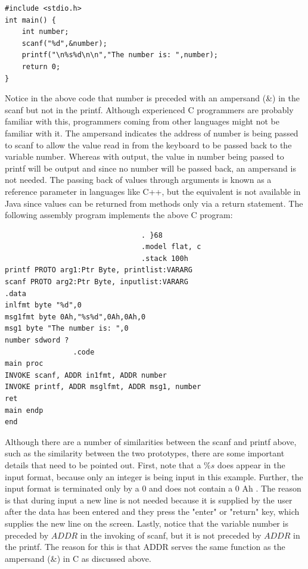 \documentclass[10pt]{book}
\begin{document}
\begin{verbatim}
#include <stdio.h>
int main() {
    int number;
    scanf("%d",&number);
    printf("\n%s%d\n\n","The number is: ",number);
    return 0;
}
\end{verbatim}

Notice in the above code that number is preceded with an ampersand (\&) in the scanf but not in the printf. Although experienced C programmers are probably familiar with this, programmers coming from other languages might not be familiar with it. The ampersand indicates the address of number is being passed to scanf to allow the value read in from the keyboard to be passed back to the variable number. Whereas with output, the value in number being passed to printf will be output and since no number will be passed back, an ampersand is not needed. The passing back of values through arguments is known as a reference parameter in languages like C++, but the equivalent is not available in Java since values can be returned from methods only via a return statement. The following assembly program implements the above C program:

\begin{verbatim}
                                . }68
                                .model flat, c
                                .stack 100h
printf PROTO arg1:Ptr Byte, printlist:VARARG
scanf PROTO arg2:Ptr Byte, inputlist:VARARG
.data
inlfmt byte "%d",0
msg1fmt byte 0Ah,"%s%d",0Ah,0Ah,0
msg1 byte "The number is: ",0
number sdword ?
                .code
main proc
INVOKE scanf, ADDR in1fmt, ADDR number
INVOKE printf, ADDR msglfmt, ADDR msg1, number
ret
main endp
end
\end{verbatim}

Although there are a number of similarities between the scanf and printf above, such as the similarity between the two prototypes, there are some important details that need to be pointed out. First, note that a $\% s$ does appear in the input format, because only an integer is being input in this example. Further, the input format is terminated only by a 0 and does not contain a 0 Ah . The reason is that during input a new line is not needed because it is supplied by the user after the data has been entered and they press the "enter" or "return" key, which supplies the new line on the screen. Lastly, notice that the variable number is preceded by $A D D R$ in the invoking of scanf, but it is not preceded by $A D D R$ in the printf. The reason for this is that ADDR serves the same function as the ampersand (\&) in C as discussed above.
\end{document}
